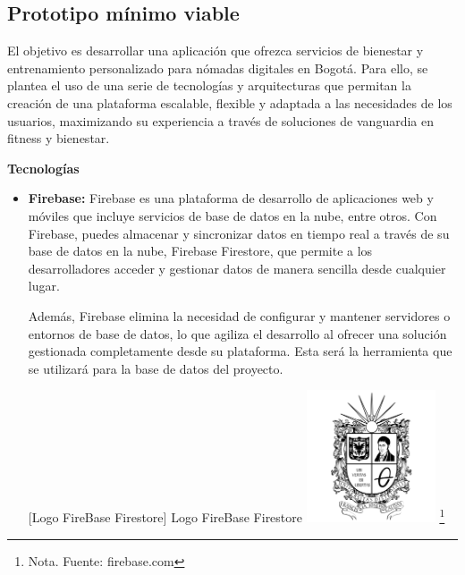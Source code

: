 \subsection{Prototipo mínimo viable}
{\color{red}
El objetivo es desarrollar una aplicación que ofrezca servicios de bienestar y entrenamiento personalizado para nómadas digitales en Bogotá. Para ello, se plantea el uso de una serie de tecnologías y arquitecturas que permitan la creación de una plataforma escalable, flexible y adaptada a las necesidades de los usuarios, maximizando su experiencia a través de soluciones de vanguardia en fitness y bienestar.



\textbf{Tecnologías}

\begin{itemize}
    
    \item \textbf{Firebase: } Firebase es una plataforma de desarrollo de aplicaciones web y móviles que incluye servicios de base de datos en la nube, entre otros. Con Firebase, puedes almacenar y sincronizar datos en tiempo real a través de su base de datos en la nube, Firebase Firestore, que permite a los desarrolladores acceder y gestionar datos de manera sencilla desde cualquier lugar.
    
    Además, Firebase elimina la necesidad de configurar y mantener servidores o entornos de base de datos, lo que agiliza el desarrollo al ofrecer una solución gestionada completamente desde su plataforma. Esta será la herramienta que se utilizará para la base de datos del proyecto.

   
    \vspace{2mm}
        \begin{minipage}{0.9\textwidth}
        \centering
        [{Logo FireBase Firestore}]{ Logo FireBase Firestore  }
        \label{Firestore}
         \includegraphics[width=0.3\textwidth]{Content/Images/Escudo_UD.png}
        \footnote{Nota. \textup{Fuente: firebase.com}}
    \end{minipage}


\end{itemize}}
